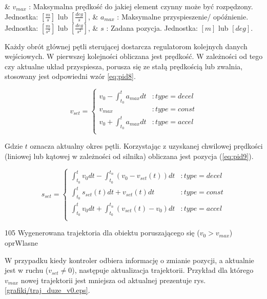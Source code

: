 \begin{easylist}
	& $ v_{max} $ : Maksymalna prędkość do jakiej element czynny może być rozpędzony. Jednostka: $[\frac{m}{s}] $ lub  $ [\frac{deg}{s}] $,
	& $ a_{max} $ : Maksymalne przyspieszenie/ opóźnienie. Jednostka: $[\frac{m}{s^2}] $ lub  $ [\frac{deg}{s^2}] $,
	& $ s $ : Zadana pozycja. Jednostka: $[m] $ lub  $ [deg] $.
	\\
\end{easylist}

Każdy obrót głównej pętli sterującej dostarcza regulatorom kolejnych danych wejściowych. W pierwszej kolejności obliczana jest prędkość. W zależności od tego czy aktualne układ przyspiesza, porusza się ze stałą prędkością lub zwalnia, stosowany jest odpowiedni wzór \ref{eq:pid8}.

\begin{equation} \label{eq:pid8}
	v_{set} =  \left\{
  \begin{array}{ll}
    v_0 - \int_{t_0}^{t} a_{max} dt & : type = decel \\
    v_{max} & : type = const \\
    v_0 + \int_{t_0}^{t} a_{max} dt & : type = accel \\
  \end{array}
\right.
\end{equation}

Gdzie $ t $ oznacza aktualny okres pętli. Korzystając z uzyskanej chwilowej prędkości (liniowej lub kątowej w zależności od silnika) obliczana jest pozycja (\ref{eq:pid9}).

\begin{equation} \label{eq:pid9}
	s_{set} =  \left\{
  \begin{array}{ll}
    \int_{t_0}^{t} v_0 dt - \int_{t_0}^{t_n} (v_0 - v_{set}(t)) dt & : type = decel \\
    \int_{t_0}^{t} s_{set}(t) dt + v_{set}(t) dt & : type = const \\
    \int_{t_0}^{t} v_0 dt + \int_{t_0}^{t_n} (v_{set}(t) - v_0) dt & : type = accel \\
  \end{array}
\right.
\end{equation}

	{105}
	{Wygenerowana trajektoria dla obiektu poruszającego się ($ v_0 > v_{max} $)}
	{oprWlasne}

W przypadku kiedy kontroler odbiera informację o zmianie pozycji, a aktualnie jest w ruchu ($ v_{set} \neq 0$), następuje aktualizacja trajektorii. Przykład dla którego $ v_{max} $ nowej trajektorii jest mniejsza od aktualnej prezentuje rys. \ref{grafiki/traj_duze_v0.eps}. \\
	
